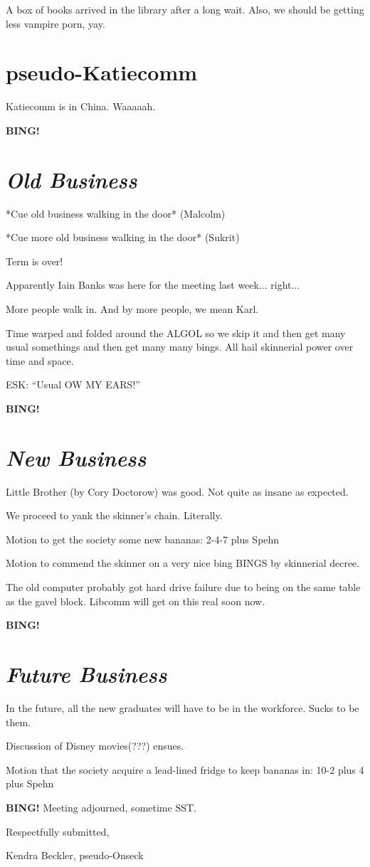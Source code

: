 \documentclass[10pt]{article}
\newcommand{\bing}{{\bf BING!} }
\newcommand{\goto}[1]{\bing \vskip 12pt \section*{{\em{#1}}}}
\newcommand{\ps}{ plus Spehn\xspace}
\begin{document}
A box of books arrived in the library after a long wait.  Also, we should be getting less vampire porn, yay.

\section*{pseudo-Katiecomm}

Katiecomm is in China.  Waaaaah.

\goto{Old Business}

*Cue old business walking in the door* (Malcolm)

*Cue more old business walking in the door* (Sukrit)

Term is over!

Apparently Iain Banks was here for the meeting last week... right...

More people walk in.  And by more people, we mean Karl.

Time warped and folded around the ALGOL so we skip it and then get many usual somethings and then get many many bings.  All hail skinnerial power over time and space.

ESK: ``Usual OW MY EARS!''

\goto{New Business}

Little Brother (by Cory Doctorow) was good.  Not quite as insane as expected.

We proceed to yank the skinner's chain.  Literally.

Motion to get the society some new bananas: 2-4-7 \ps

Motion to commend the skinner on a very nice bing BINGS by skinnerial decree.

The old computer probably got hard drive failure due to being on the same table as the gavel block.  Libcomm will get on this real soon now.

\goto{Future Business}

In the future, all the new graduates will have to be in the workforce.  Sucks to be them.

Discussion of Disney movies(???) ensues.

Motion that the society acquire a lead-lined fridge to keep bananas in: 10-2 plus 4 \ps

\bing
\noindent
Meeting adjourned, sometime SST.

\vspace{18pt}

\centerline{Respectfully submitted,}
\centerline{Kendra Beckler, pseudo-Onseck}
\end{document}
